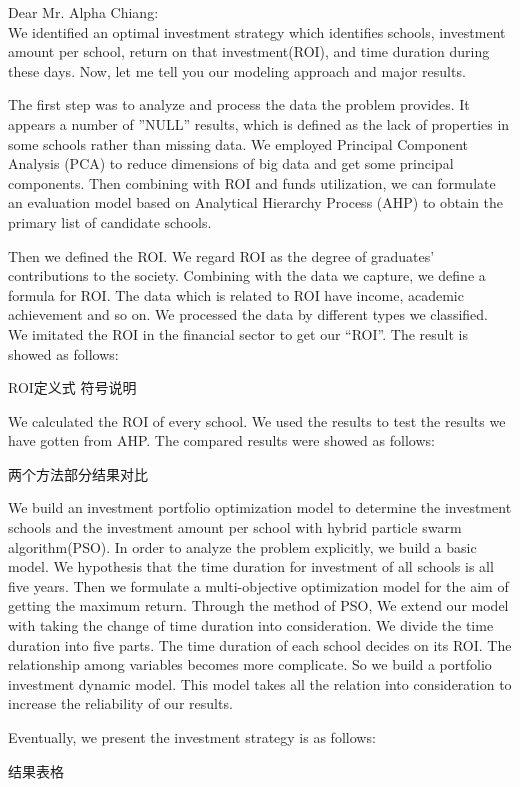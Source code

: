 Dear Mr. Alpha Chiang:\\
We identified an optimal investment strategy which identifies schools, investment amount per school, return on that investment(ROI), and time duration during these days. Now, let me tell you our modeling approach and major results.\par
The first step was to analyze and process the data the problem provides. It appears a number of ''NULL'' results, which is defined as the lack of properties in some schools rather than missing data. We employed Principal Component Analysis (PCA) to reduce dimensions of big data and get some principal components. Then combining with ROI and funds utilization, we can formulate an evaluation model based on Analytical Hierarchy Process (AHP) to obtain the primary list of candidate schools.\par
Then we defined the ROI. We regard ROI as the degree of graduates’ contributions to the society. Combining with the data we capture, we define a formula for ROI. The data which is related to ROI have income, academic achievement and so on. We processed the data by different types we classified. We imitated the ROI in the financial sector to get our “ROI”. The result is showed as follows:

ROI定义式
符号说明

We calculated the ROI of every school. We used the results to test the results we have gotten from AHP. The compared results were showed as follows:

两个方法部分结果对比

We build an investment portfolio optimization model to determine the investment schools and the investment amount per school with hybrid particle swarm algorithm(PSO). In order to analyze the problem explicitly, we build a basic model. We hypothesis that the time duration for investment of all schools is all five years. Then we formulate a multi-objective optimization model for the aim of getting the maximum return. Through the method of PSO, We extend our model with taking the change of time duration into consideration. We divide the time duration into five parts. The time duration of each school decides on its ROI. The relationship among variables becomes more complicate. So we build a portfolio investment dynamic model. This model takes all the relation into consideration to increase the reliability of our results. \par
Eventually, we present the investment strategy is as follows:

结果表格
